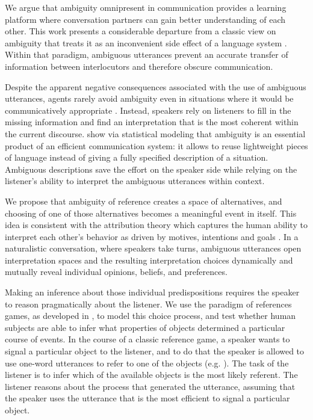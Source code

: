 \documentclass[10pt,a4paper]{article}
\begin{document}
We argue that ambiguity omnipresent in communication provides a learning platform where conversation partners can gain better understanding of each other. This work presents a considerable departure from a classic view on ambiguity that treats it as an inconvenient side effect of a language system \cite{grice1975,chomsky2002minimalism}. Within that paradigm, ambiguous utterances prevent an accurate transfer of information between interlocutors and therefore obscure communication. 

Despite the apparent negative consequences associated with the use of ambiguous utterances, agents rarely avoid ambiguity even in situations where it would be communicatively appropriate \cite{wasow2015, ferreira2008}. Instead, speakers rely on listeners to fill in the missing information and find an interpretation that is the most coherent within the current discourse.   show via statistical modeling that ambiguity is an essential product of an efficient communication system: it allows to reuse lightweight pieces of language instead of giving a fully specified description of a situation. Ambiguous descriptions save the effort on the speaker side while relying on the listener's ability to interpret the ambiguous utterances within context.

We propose that ambiguity of reference creates a space of alternatives, and choosing of one of those alternatives becomes a meaningful event in itself. This idea is consistent with the attribution theory which captures the human ability to interpret each other's behavior as driven by motives, intentions and goals \cite{jones1965acts, kelley1967attribution, kelley1970social}.
 In a naturalistic conversation, where speakers take turns, ambiguous utterances open interpretation spaces and the resulting interpretation choices dynamically and mutually reveal individual opinions, beliefs, and preferences. 
 
 Making an inference about those individual predispositions requires the speaker to reason pragmatically about the listener.
We use the paradigm of references games, as developed in , to model this choice process, and test whether human subjects are able to infer what properties of objects determined a particular course of events. In the course of a classic reference game, a speaker wants to signal a particular object to the listener, and to do that the speaker is allowed to use one-word utterances to refer to one of the objects (e.g. ). The task of the listener is to infer which of the available objects is the most likely referent. The listener reasons about the process that generated the utterance, assuming that the speaker uses the utterance that is the most efficient to signal a particular object. 
\end{document}
